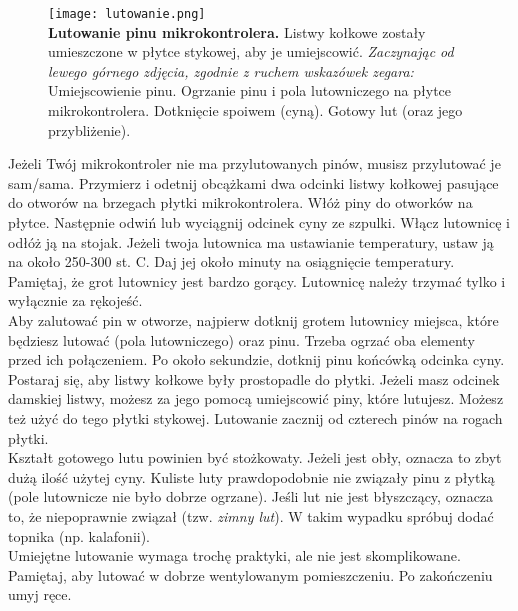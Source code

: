 \documentclass{pdfBooklets}
\begin{document}
\begin{figure}[h!]\begin{Ramka}{}\begin{center}
  {\noindent\texttt{[image: lutowanie.png]}}\\
  \small
  \textbf{Lutowanie pinu mikrokontrolera.} Listwy kołkowe zostały umieszczone w płytce stykowej, aby je umiejscowić. \textit{Zaczynając od lewego górnego zdjęcia,
    zgodnie z ruchem wskazówek zegara:} Umiejscowienie pinu. Ogrzanie pinu i pola lutowniczego na płytce mikrokontrolera.
  Dotknięcie spoiwem (cyną).
  Gotowy lut (oraz jego przybliżenie).
\end{center}\end{Ramka}\end{figure}

Jeżeli Twój mikrokontroler nie ma przylutowanych pinów, musisz przylutować je sam/sama. Przymierz i odetnij
obcążkami dwa odcinki listwy kołkowej pasujące do otworów na brzegach płytki mikrokontrolera. Włóż piny do otworków
na płytce. Następnie odwiń lub wyciągnij odcinek cyny ze szpulki. Włącz lutownicę i odłóż ją na stojak. Jeżeli twoja lutownica
ma ustawianie temperatury, ustaw ją na około 250-300 st. C. Daj jej około minuty na osiągnięcie temperatury. Pamiętaj, że grot
lutownicy jest bardzo gorący. Lutownicę należy trzymać tylko i wyłącznie za rękojeść.
\\

Aby zalutować pin w otworze, najpierw dotknij grotem lutownicy
miejsca, które będziesz lutować (pola lutowniczego) oraz pinu. Trzeba ogrzać oba elementy przed ich połączeniem. Po około sekundzie, dotknij pinu końcówką odcinka cyny.
\\

Postaraj się, aby listwy kołkowe były prostopadle do płytki. Jeżeli masz odcinek damskiej listwy, możesz za jego pomocą
umiejscowić piny, które lutujesz. Możesz też użyć do tego płytki stykowej. Lutowanie zacznij od czterech pinów na rogach płytki.
\\

Kształt gotowego lutu powinien być stożkowaty. Jeżeli jest obły, oznacza to zbyt dużą ilość użytej cyny. Kuliste luty prawdopodobnie nie związały pinu z płytką (pole lutownicze nie było dobrze ogrzane). Jeśli lut nie jest błyszczący, oznacza to, że niepoprawnie związał (tzw. \textit{zimny lut}). W takim wypadku spróbuj dodać
topnika (np. kalafonii).\\

Umiejętne lutowanie wymaga trochę praktyki, ale nie jest skomplikowane. Pamiętaj, aby lutować w dobrze wentylowanym
pomieszczeniu. Po zakończeniu umyj ręce.
\end{document}
